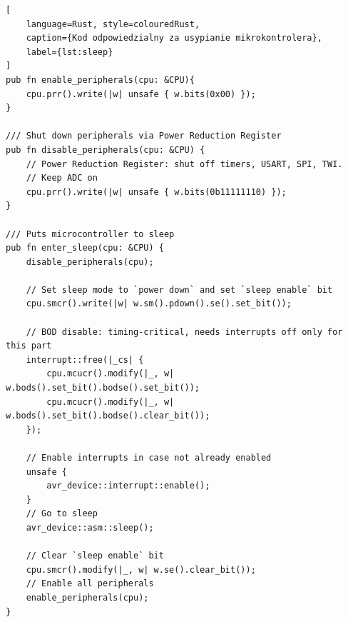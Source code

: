 \begin{lstlisting}[
    language=Rust, style=colouredRust, 
    caption={Kod odpowiedzialny za usypianie mikrokontrolera},
    label={lst:sleep}
]
pub fn enable_peripherals(cpu: &CPU){
    cpu.prr().write(|w| unsafe { w.bits(0x00) });
}

/// Shut down peripherals via Power Reduction Register
pub fn disable_peripherals(cpu: &CPU) {
    // Power Reduction Register: shut off timers, USART, SPI, TWI.
    // Keep ADC on
    cpu.prr().write(|w| unsafe { w.bits(0b11111110) });
}

/// Puts microcontroller to sleep
pub fn enter_sleep(cpu: &CPU) {
    disable_peripherals(cpu);

    // Set sleep mode to `power down` and set `sleep enable` bit
    cpu.smcr().write(|w| w.sm().pdown().se().set_bit());

    // BOD disable: timing-critical, needs interrupts off only for this part
    interrupt::free(|_cs| {
        cpu.mcucr().modify(|_, w| w.bods().set_bit().bodse().set_bit());
        cpu.mcucr().modify(|_, w| w.bods().set_bit().bodse().clear_bit());
    });

    // Enable interrupts in case not already enabled
    unsafe {
        avr_device::interrupt::enable();
    }
    // Go to sleep
    avr_device::asm::sleep();

    // Clear `sleep enable` bit
    cpu.smcr().modify(|_, w| w.se().clear_bit());
    // Enable all peripherals
    enable_peripherals(cpu);
}
\end{lstlisting}
